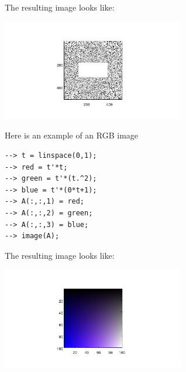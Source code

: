 The resulting image looks like:


\centerline{\includegraphics[width=8cm]{image1}}

Here is an example of an RGB image 
\begin{verbatim}
--> t = linspace(0,1);
--> red = t'*t;
--> green = t'*(t.^2);
--> blue = t'*(0*t+1);
--> A(:,:,1) = red; 
--> A(:,:,2) = green; 
--> A(:,:,3) = blue;
--> image(A);
\end{verbatim}
The resulting image looks like:


\centerline{\includegraphics[width=8cm]{image2}}


